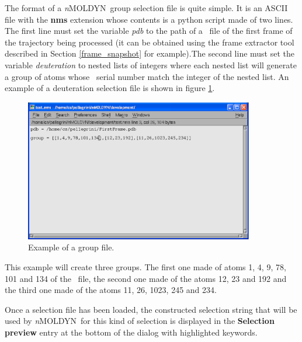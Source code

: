 \documentclass[a4paper,11pt]{report}
\newcommand{\NMOLDYN}{\textit{n}MOLDYN}
\begin{document}
The format of a \NMOLDYN\ group selection file is quite simple. It is an ASCII file with the \textbf{nms} extension whose 
contents is a python script made of two lines. The first line must set the variable \textit{pdb} to the path of a \PDB\ file 
of the first frame of the trajectory being processed (it can be obtained using the frame extractor tool described in 
Section \ref{frame_snapshot} for example).The second line must set the variable \textit{deuteration} to nested lists of 
integers where each nested list will generate a group of atoms whose \PDB\ serial number match the integer of the nested list. 
An example of a deuteration selection file is shown in figure \ref{fig:group_selection_file}.
\begin{figure}[h!]
\begin{center}
\includegraphics[width=10cm]{Figures/group_selection_file.eps}
\end{center}
\caption[Example of a group selection file]{Example of a group file.}
\label{fig:group_selection_file}
\end{figure}   

This example will create three groups. The first one made of atoms 1, 4, 9, 78, 101 and 134 of the \PDB\ file, the second one made of the 
atoms 12, 23 and 192 and the third one made of the atoms 11, 26, 1023, 245 and 234.

Once a selection file has been loaded, the constructed selection string that will be used by \NMOLDYN\ for this kind of 
selection is displayed in the \textbf{Selection preview} entry at the bottom of the dialog with highlighted keywords.
\end{document}
